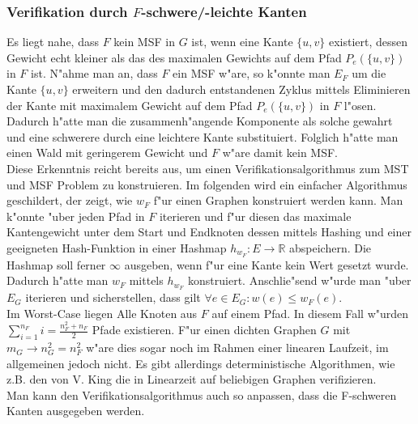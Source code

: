 \subsubsection{Verifikation durch $F$-schwere/-leichte Kanten}
\label{sec:verification}
Es liegt nahe, dass $F$ kein MSF in $G$ ist, wenn eine Kante $\{u,v\}$ 
    existiert, dessen Gewicht echt kleiner als das des maximalen Gewichts auf dem
    Pfad $P_e(\{u,v\})$ in $F$ ist. 
    N"ahme man an, dass $F$ ein MSF w"are, 
    so k"onnte man $E_F$ um die Kante $\{u,v\}$ erweitern und den dadurch 
    entstandenen Zyklus mittels Eliminieren der Kante mit maximalem Gewicht auf dem
    Pfad $P_e(\{u,v\})$ in $F$ l"osen. Dadurch h"atte man die zusammenh"angende 
    Komponente als solche gewahrt und eine schwerere durch eine leichtere Kante
    substituiert. Folglich h"atte man einen Wald mit geringerem Gewicht
    und $F$ w"are damit kein MSF.\\
Diese Erkenntnis reicht bereits aus, um einen Verifikationsalgorithmus zum 
    MST und MSF Problem zu konstruieren.
    Im folgenden wird ein einfacher Algorithmus geschildert, 
    der zeigt, wie $w_F$ f"ur einen
    Graphen konstruiert werden kann.
    Man k"onnte "uber jeden Pfad in $F$ iterieren und f"ur diesen 
    das maximale Kantengewicht unter dem Start und Endknoten dessen mittels
    Hashing und einer geeigneten Hash-Funktion in einer Hashmap 
    $h_{w_F} : E \rightarrow \mathbb{R}$ abspeichern.
    Die Hashmap soll ferner $\infty$ ausgeben, wenn f"ur eine Kante kein Wert 
    gesetzt wurde.
    Dadurch h"atte man $w_F$ mittels $h_{w_F}$ konstruiert.
    Anschlie"send w"urde man "uber $E_G$ iterieren und sicherstellen, dass gilt
    $\forall e \in E_G: w(e) \leq w_F(e)$.\\
    Im Worst-Case liegen Alle Knoten aus $F$ auf einem Pfad.
    In diesem Fall w"urden $\sum_{i=1}^{n_F} i = \frac{n_F^2+n_F}{2}$ Pfade existieren.
    F"ur einen dichten Graphen $G$ mit $m_G \rightarrow n_G^2 = n_F^2$ w"are dies sogar noch im Rahmen 
    einer linearen Laufzeit, im allgemeinen jedoch nicht.
    Es gibt allerdings deterministische Algorithmen, wie z.B. den von V. King 
    \cite{simpleVer}
    die in Linearzeit auf beliebigen Graphen verifizieren.\\
Man kann den Verifikationsalgorithmus auch so anpassen, dass die F-schweren Kanten
    ausgegeben werden.\\
